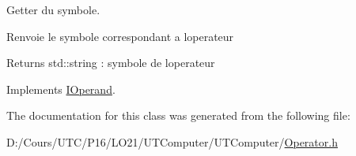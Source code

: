 Getter du symbole. 

Renvoie le symbole correspondant a l\textquotesingle{}operateur

\begin{DoxyReturn}{Returns}
std\+::string \+: symbole de l\textquotesingle{}operateur 
\end{DoxyReturn}


Implements \hyperlink{class_i_operand}{I\+Operand}.



The documentation for this class was generated from the following file\+:\begin{DoxyCompactItemize}
\item 
D\+:/\+Cours/\+U\+T\+C/\+P16/\+L\+O21/\+U\+T\+Computer/\+U\+T\+Computer/\hyperlink{_operator_8h}{Operator.\+h}\end{DoxyCompactItemize}
